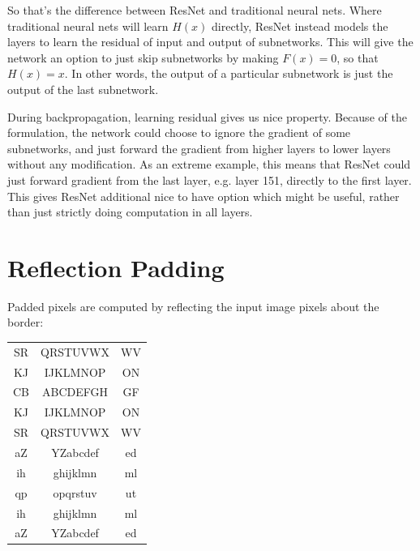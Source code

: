 \documentclass{scrartcl}
\begin{document}
So that’s the difference between ResNet and traditional neural nets. Where traditional neural nets will learn $H(x)$ directly, ResNet instead models the layers to learn the residual of input and output of subnetworks. This will give the network an option to just skip subnetworks by making $F(x) = 0$, so that $H(x) = x$. In other words, the output of a particular subnetwork is just the output of the last subnetwork.

During backpropagation, learning residual gives us nice property. Because of the formulation, the network could choose to ignore the gradient of some subnetworks, and just forward the gradient from higher layers to lower layers without any modification. As an extreme example, this means that ResNet could just forward gradient from the last layer, e.g. layer 151, directly to the first layer. This gives ResNet additional nice to have option which might be useful, rather than just strictly doing computation in all layers.

\section*{Reflection Padding \cite{padding}}
Padded pixels are computed by reflecting the input image
pixels about the border:

\begin{tabular}{c|c|c}
SR & QRSTUVWX & WV\\
KJ & IJKLMNOP & ON\\
\hline
CB&ABCDEFGH&GF\\
KJ&IJKLMNOP&ON\\
SR&QRSTUVWX&WV\\
aZ&YZabcdef&ed\\
ih&ghijklmn&ml\\
qp&opqrstuv&ut\\
\hline
ih&ghijklmn&ml\\
aZ&YZabcdef&ed
\end{tabular}

\newpage


\end{document}
